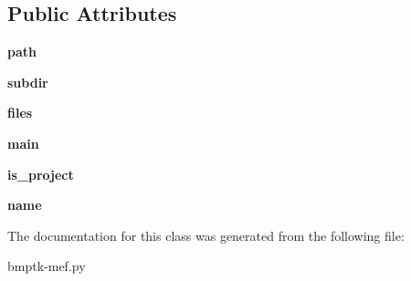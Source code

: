 \subsection*{Public Attributes}
\begin{DoxyCompactItemize}
\item 
{\bfseries path}\hypertarget{classbmptk-mef_1_1projectdir_a857f1a633bf4cdab26db5fc43383ef20}{}\label{classbmptk-mef_1_1projectdir_a857f1a633bf4cdab26db5fc43383ef20}

\item 
{\bfseries subdir}\hypertarget{classbmptk-mef_1_1projectdir_ad9441fc8c3eaf50b273e5e368b231e21}{}\label{classbmptk-mef_1_1projectdir_ad9441fc8c3eaf50b273e5e368b231e21}

\item 
{\bfseries files}\hypertarget{classbmptk-mef_1_1projectdir_a2d51f1741b4495ae87b64ab84264529d}{}\label{classbmptk-mef_1_1projectdir_a2d51f1741b4495ae87b64ab84264529d}

\item 
{\bfseries main}\hypertarget{classbmptk-mef_1_1projectdir_a3268dc803d0b9b7bb2eda923858fcdaf}{}\label{classbmptk-mef_1_1projectdir_a3268dc803d0b9b7bb2eda923858fcdaf}

\item 
{\bfseries is\+\_\+project}\hypertarget{classbmptk-mef_1_1projectdir_a681cf74fd8e6e6c3fc4a2c2e33cccde9}{}\label{classbmptk-mef_1_1projectdir_a681cf74fd8e6e6c3fc4a2c2e33cccde9}

\item 
{\bfseries name}\hypertarget{classbmptk-mef_1_1projectdir_a0905df708de7593fa85dd675addb4c7e}{}\label{classbmptk-mef_1_1projectdir_a0905df708de7593fa85dd675addb4c7e}

\end{DoxyCompactItemize}


The documentation for this class was generated from the following file\+:\begin{DoxyCompactItemize}
\item 
bmptk-\/mef.\+py\end{DoxyCompactItemize}
